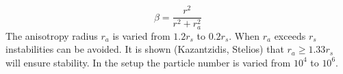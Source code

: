 \begin{equation}
\beta = \frac{r^2}{r^2 + r_a^2}  
\end{equation}
The anisotropy radius $r_a$ is varied from $1.2 r_s$ to $ 0.2 r_s $. When $r_a$ exceeds $r_s$ instabilities can be avoided. It is shown (Kazantzidis, Stelios)  that $r_a \geq 1.33r_s$ will ensure stability. In the setup the particle number is varied from $ 10^4 $ to $ 10^6 $.